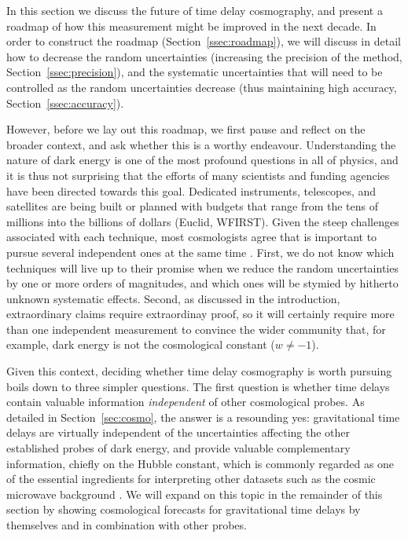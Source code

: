 In this section we discuss the future of time delay cosmography, and
present
a
roadmap of how this
measurement might be improved in the next decade. In order to construct the roadmap
(Section~\ref{ssec:roadmap}), we will discuss in detail how to
decrease the random uncertainties (increasing the precision of
the method,
Section~\ref{ssec:precision}), and the systematic uncertainties
that will
need to be controlled as the random uncertainties decrease
(thus maintaining high accuracy, Section~\ref{ssec:accuracy}).

However, before we lay out this roadmap, we first pause and
reflect on the broader context, and ask whether this is a worthy
endeavour.  Understanding the nature of dark energy is one of the most
profound questions in all of physics, and it is thus not surprising
that the efforts of many scientists and funding agencies have been
directed towards this goal. Dedicated instruments, telescopes, and
satellites are being built or planned with budgets that range from the
tens of millions into the billions of dollars (Euclid, WFIRST). Given
the steep challenges associated with each technique, most cosmologists
agree that is important to pursue several independent ones at the same
time \citep{DETF,DESC}. First, we do not know which techniques will live up
to their promise when we reduce the random uncertainties by one or
more orders of magnitudes, and which ones will be stymied by hitherto unknown
systematic effects. Second, as discussed in the introduction,
extraordinary claims require extraordinay proof, so it will certainly
require more than one independent measurement to convince the wider
community that, for example, dark energy is not the cosmological
constant ($w\neq-1$).

Given this context, deciding whether time delay cosmography is worth
pursuing boils down to three simpler questions. The first question is
whether time delays contain valuable information {\it independent} of
other cosmological probes. As detailed in Section~\ref{sec:cosmo}, the
answer is a resounding yes: gravitational time delays are virtually
independent of the uncertainties affecting the other established
probes of dark energy, and provide valuable complementary information,
chiefly on the Hubble constant, which is commonly regarded as one of
the essential ingredients for interpreting other datasets such as the
cosmic microwave background \citep{Hu05,Suy++12,Wei++13,Rie++16}.  We
will expand on this topic in the remainder of this section by showing
cosmological forecasts for gravitational time delays by themselves and
in combination with other probes.


